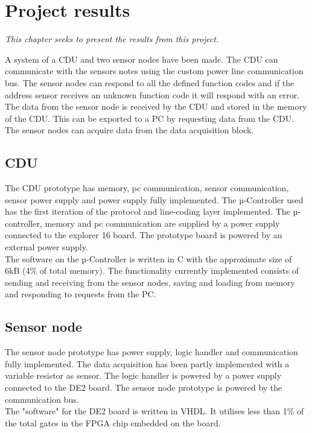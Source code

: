 \chapter{Project results}
\textit{This chapter seeks to present the results from this project.}

A system of a CDU and two sensor nodes have been made. The CDU can communicate with the sensors notes using the custom power line communication bus. The sensor nodes can respond to all the defined function codes and if the address sensor receives an unknown function code it will respond with an error.\\
The data from the sensor node is received by the CDU and stored in the memory of the CDU. This can be exported to a PC by requesting data from the CDU.\\
The sensor nodes can acquire data from the data acquisition block.
\section{CDU}
The CDU prototype has memory, pc communication, sensor communication, sensor power supply and power supply fully implemented. The µ-Controller used has the first iteration of the protocol and line-coding layer implemented. The µ-controller, memory and pc communication are supplied by a power supply connected to the explorer 16 board. The prototype board is powered by an external power supply.\\
The software on the µ-Controller is written in C with the approximate size of 6kB (4\% of total memory). The functionality currently implemented consists of sending and receiving from the sensor nodes, saving and loading from memory and responding to requests from the PC.

\section{Sensor node}
The sensor node prototype has power supply, logic handler and communication fully implemented. The data acquisition has been partly implemented with a variable resistor as sensor. The logic handler is powered by a power supply connected to the DE2 board. The sensor node prototype is powered by the communication bus.\\
The "software" for the DE2 board is written in VHDL. It utilises less than 1\% of the total gates in the FPGA chip embedded on the board.

